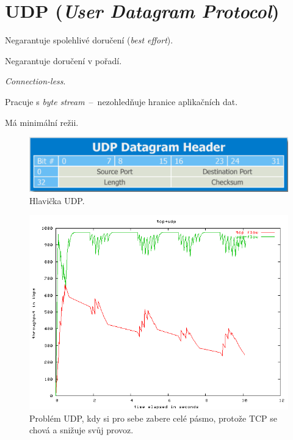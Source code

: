 
\section{UDP (\textit{User Datagram Protocol})}

\begin{compactitem}
    \item Negarantuje spolehlivé doručení (\textit{best effort}).
    \item Negarantuje doručení v pořadí.
    \item \textit{Connection-less}.
    \item Pracuje s \textit{byte stream}~--~nezohledňuje hranice aplikačních dat.
    \item Má minimální režii.
\end{compactitem}

\begin{figure}[H]
    \centering
    \includegraphics[width=0.75\linewidth]{udp_header.png}
    \caption{Hlavička UDP.}
\end{figure}

\begin{figure}[H]
    \centering
    \includegraphics[width=1\linewidth]{udp_problem.png}
    \caption{Problém UDP, kdy si pro sebe zabere celé pásmo, protože TCP se chová  a snižuje svůj provoz.}
\end{figure}

